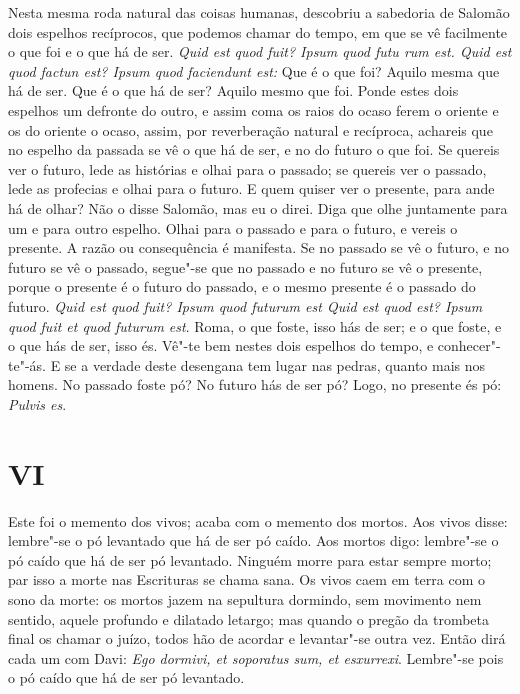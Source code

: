 Nesta mesma roda natural das coisas humanas, descobriu a sabedoria de
Salomão dois espelhos recíprocos, que podemos chamar do tempo, em que se
vê facilmente o que foi e o que há de ser. \emph{Quid est quod fuit?
Ipsum quod futu rum est. Quid est quod factun est? Ipsum quod faciendunt
est:} Que é o que foi? Aquilo mesma que há de ser. Que é o que há de
ser? Aquilo mesmo que foi. Ponde estes dois espelhos um %
defronte do outro, e assim coma os raios do ocaso ferem o oriente e os
do oriente o ocaso, assim, por reverberação natural e recíproca,
achareis que no espelho da passada se vê o que há de ser, e no do futuro
o que foi. Se quereis ver o futuro, lede as histórias e olhai para o
passado; se quereis ver o passado, lede as profecias e olhai para o
futuro. E quem quiser ver o presente, para ande há de olhar? Não o disse Salomão, mas eu o direi. Diga que olhe juntamente para um e para outro espelho. Olhai para
o passado e para o futuro, e vereis o presente. A razão ou consequência
é manifesta. Se no passado se vê o futuro, e no futuro se vê o passado,
segue"-se que no passado e no futuro se vê o presente, porque o presente
é o futuro do passado, e o mesmo presente é o passado do futuro.
\emph{Quid est quod fuit? Ipsum quod futurum est Quid est quod est?
Ipsum quod fuit et quod futurum est}. Roma, o que foste, isso hás de
ser; e o que foste, e o que hás de ser, isso és. Vê"-te bem nestes dois
espelhos do tempo, e conhecer"-te"-ás. E se a verdade deste desengana tem
lugar nas pedras, quanto mais nos homens. No passado foste pó? No futuro
hás de ser pó? Logo, no presente és pó: \emph{Pulvis es}.

\section{VI}

Este foi o memento dos vivos; acaba com o memento dos mortos. Aos vivos
disse: lembre"-se o pó levantado que há de ser pó caído. Aos mortos digo:
lembre"-se o pó caído que há de ser pó levantado. Ninguém morre para
estar sempre morto; par isso a morte nas Escrituras se chama sana. Os
vivos caem em terra com o sono da morte: os mortos jazem na sepultura
dormindo, sem movimento nem sentido, aquele profundo e dilatado letargo;
mas quando o pregão da trombeta final os chamar o juízo, todos hão de
acordar e levantar"-se outra vez. Então dirá cada um com Davi: \emph{Ego
dormivi, et soporatus sum, et esxurrexi}. Lembre"-se pois o pó caído
que há de ser pó levantado.

